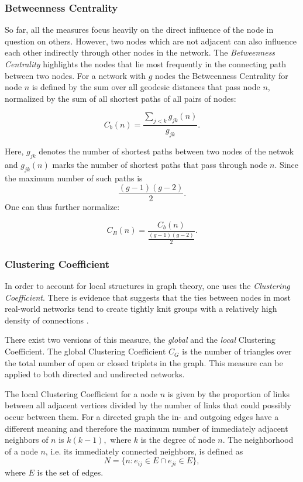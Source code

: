 \subsubsection{Betweenness Centrality}

So far, all the measures focus heavily on the direct influence of the node in question on others. 
However, two nodes which are not adjacent can also influence each other indirectly through other nodes in the network. 
The \emph{Betweenness Centrality} highlights the nodes that lie most frequently in the connecting path between two nodes. 
For a network with $g$ nodes the Betweenness Centrality for node $n$ is defined by the sum over all geodesic distances that pass node $n$, normalized by the sum of all shortest paths of all pairs of nodes:

\begin{equation*}
C_b(n) = \frac{\sum\limits_{j<k} g_{jk}(n)}{g_{jk}}.
\end{equation*}

Here, $g_{jk}$ denotes the number of shortest paths between two nodes of the netwok and $g_{jk}(n)$ marks the number of shortest paths that pass through node $n$. Since the maximum number of such paths is $$\frac{(g-1)(g-2)}{2}.$$ 
One can thus further normalize:

\begin{equation}
C_B(n) = \frac{C_b(n)}{\frac{(g-1)(g-2)}{2}}.
\end{equation}

\subsubsection{Clustering Coefficient}

In order to account for local structures in graph theory, one uses the \emph{Clustering Coefficient}. 
There is evidence that suggests that the ties between nodes in most real-world networks tend to create tightly knit groups with a relatively high density of connections \cite{graphcluster}. 

There exist two versions of this measure, the \emph{global} and the \emph{local} Clustering Coefficient. 
The global Clustering Coefficient $C_G$ is the number of triangles over the total number of open or closed triplets in the graph. 
This measure can be applied to both directed and undirected networks.

The local Clustering Coefficient for a node $n$ is given by the proportion of links between all adjacent vertices divided by the number of links that could possibly occur between them. 
For a directed graph the in- and outgoing edges have a different meaning and therefore the maximum number of immediately adjacent neighbors of $n$ is $k (k-1),$ where $k$ is the degree of node $n$. 
The neighborhood of a node $n$, i.e. its immediately connected neighbors, is defined as $$N = \{n: e_{ij}\in E \cap e_{ji} \in E\},$$ where $E$ is the set of edges. 

